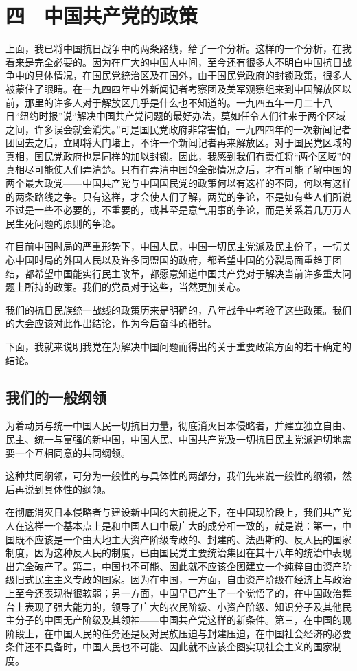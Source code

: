 \section{四　中国共产党的政策}

上面，我已将中国抗日战争中的两条路线，给了一个分析。这样的一个分析，在我看来是完全必要的。因为在广大的中国人中间，至今还有很多人不明白中国抗日战争中的具体情况，在国民党统治区及在国外，由于国民党政府的封锁政策，很多人被蒙住了眼睛。在一九四四年中外新闻记者考察团及美军观察组来到中国解放区以前，那里的许多人对于解放区几乎是什么也不知道的。一九四五年一月二十八日“纽约时报”说“解决中国共产党问题的最好办法，莫如任令人们往来于两个区域之间，许多误会就会消失。”可是国民党政府非常害怕，一九四四年的一次新闻记者团回去之后，立即将大门堵上，不许一个新闻记者再来解放区。对于国民党区域的真相，国民党政府也是同样的加以封锁。因此，我感到我们有责任将“两个区域”的真相尽可能使人们弄清楚。只有在弄清中国的全部情况之后，才有可能了解中国的两个最大政党——中国共产党与中国国民党的政策何以有这样的不同，何以有这样的两条路线之争。只有这样，才会使人们了解，两党的争论，不是如有些人们所说不过是一些不必要的，不重要的，或甚至是意气用事的争论，而是关系着几万万人民生死问题的原则的争论。

在目前中国时局的严重形势下，中国人民，中国一切民主党派及民主份子，一切关心中国时局的外国人民以及许多同盟国的政府，都希望中国的分裂局面重趋于团结，都希望中国能实行民主改革，都愿意知道中国共产党对于解决当前许多重大问题上所持的政策。我们的党员对于这些，当然更加关心。

我们的抗日民族统一战线的政策历来是明确的，八年战争中考验了这些政策。我们的大会应该对此作出结论，作为今后奋斗的指针。

下面，我就来说明我党在为解决中国问题而得出的关于重要政策方面的若干确定的结论。

\subsection{我们的一般纲领}

为着动员与统一中国人民一切抗日力量，彻底消灭日本侵略者，并建立独立自由、民主、统一与富强的新中国，中国人民、中国共产党及一切抗日民主党派迫切地需要一个互相同意的共同纲领。

这种共同纲领，可分为一般性的与具体性的两部分，我们先来说一般性的纲领，然后再说到具体性的纲领。

在彻底消灭日本侵略者与建设新中国的大前提之下，在中国现阶段上，我们共产党人在这样一个基本点上是和中国人口中最广大的成分相一致的，就是说：第一，中国既不应该是一个由大地主大资产阶级专政的、封建的、法西斯的、反人民的国家制度，因为这种反人民的制度，已由国民党主要统治集团在其十八年的统治中表现出完全破产了。第二，中国也不可能、因此就不应该企图建立一个纯粹自由资产阶级旧式民主主义专政的国家。因为在中国，一方面，自由资产阶级在经济上与政治上至今还表现得很软弱；另一方面，中国早已产生了一个觉悟了的，在中国政治舞台上表现了强大能力的，领导了广大的农民阶级、小资产阶级、知识分子及其他民主分子的中国无产阶级及其领袖——中国共产党这样的新条件。第三，在中国的现阶段上，在中国人民的任务还是反对民族压迫与封建压迫，在中国社会经济的必要条件还不具备时，中国人民也不可能、因此就不应该企图实现社会主义的国家制度。

